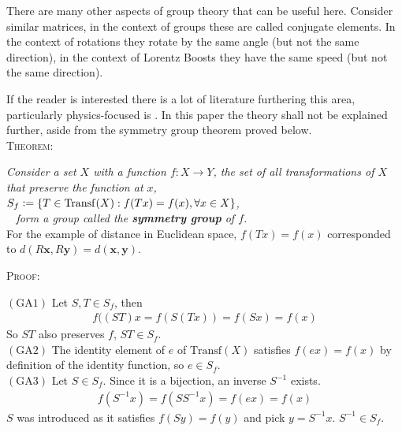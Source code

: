  There are many other aspects of group theory that can be useful here. Consider similar matrices, in the context of groups these are called conjugate elements. In the context of rotations they rotate by the same angle (but not the same direction), in the context of Lorentz Boosts they have the same speed (but not the same direction).
 
 If the reader is interested there is a lot of literature furthering this area, particularly physics-focused is \cite{SCPV3}. In this paper the theory shall not be explained further, aside from the symmetry group theorem proved below. 
\vspace{2mm} \\
\textsc{Theorem:}

{\centering \textit{Consider a set $X$ with a function $f:X\rightarrow Y$, the set of all transformations of $X$ that preserve the function at $x$,\\
$S_f\vcentcolon =\{ T \in \mathrm{Transf}(X) : f(Tx)=f(x), \forall x \in X \}$,\\
$\phantom{a}$ \hspace{48mm} form a group called the \textbf{symmetry group} of $f$.}}
\vspace{2mm} \\

For the example of distance in Euclidean space, $f(Tx)=f(x)$ corresponded to $d(R\mathbf{x},R\mathbf{y}) = d(\mathbf{x},\mathbf{y})$.

\begin{flushleft}\textsc{Proof:} \end{flushleft}

$(\mathrm{GA}1)$ Let $S,T\in S_f$, then
\begin{align*}
f((ST)x=f(S(Tx))= f(Sx) = f(x)
\end{align*}
So $ST$ also preserves $f$, $ST \in S_f$. \\

$(\mathrm{GA}2)$ The identity element of $e$ of $\mathrm{Transf}(X)$ satisfies $f(ex)=f(x)$ by definition of the identity function, so $e \in S_f$.\\

$(\mathrm{GA}3)$  Let $S \in S_f$. Since it is a bijection, an inverse $S^{-1}$ exists. 
\begin{align*}
f(S^{-1}x) = f(SS^{-1}x)= f(ex)= f(x)
\end{align*}
$S$ was introduced as it satisfies $f(Sy)=f(y)$ and pick $y=S^{-1}x$. $S^{-1} \in S_f$.\\

